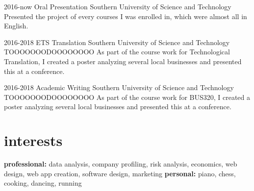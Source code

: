 \documentclass[]{friggeri-cv-a4}
\begin{document}
\begin{entrylist}


\entry
{2016-now}
{Oral Presentation}
{Southern University of Science and Technology}
{Presented the project of every courses I was enrolled in, which were almost all in English.}


\entry
{2016-2018}
{ETS Translation}
{Southern University of Science and Technology}
{TOOOOOOODOOOOOOOO As part of the course work for Technological Translation, I created a poster analyzing several local businesses and presented this at a conference.}


\entry
{2016-2018}
{Academic Writing}
{Southern University of Science and Technology}
{TOOOOOOODOOOOOOOO As part of the course work for BUS320, I created a poster analyzing several local businesses and presented this at a conference.}


\end{entrylist}


\section{interests}

\textbf{professional:} data analysis, company profiling, risk analysis, economics, web design, web app creation, software design, marketing \textbf{personal:} piano, chess, cooking, dancing, running



\end{document}
